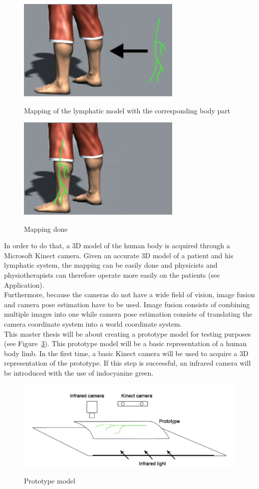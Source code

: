 \begin{figure}[h]
\caption{Mapping of the lymphatic model with the corresponding body part}
\centering
    \includegraphics[width=0.7\textwidth]{images/mapping1.png}
\label{fig:mapping1}
\end{figure}

\begin{figure}[h]
\caption{Mapping done}
\centering
    \includegraphics[width=0.7\textwidth]{images/mapping2.png}
\label{fig:mapping2}
\end{figure}

In order to do that, a 3D model of the human body is acquired through a Microsoft Kinect camera. Given an accurate 3D model of a patient and his lymphatic system, the mapping can be easily done and physicists and physiotherapists can therefore operate more easily on the patients (see Application). \\

Furthermore, because the cameras do not have a wide field of vision, image fusion and camera pose estimation have to be used. Image fusion consists of combining multiple images into one while camera pose estimation consists of translating the camera coordinate system into a world coordinate system. \\

This master thesis will be about creating a prototype model for testing purposes (see Figure~\ref{fig:prototype}). This prototype model will be a basic representation of a human body limb.  In the first time, a basic Kinect camera will be used to acquire a 3D representation of the prototype. If this step is successful, an infrared camera will be introduced with the use of indocyanine green. 

 \begin{figure}[h]
\caption{Prototype model}
\centering
    \includegraphics[width=1.0\textwidth]{images/prototype.png}
\label{fig:prototype}
\end{figure}